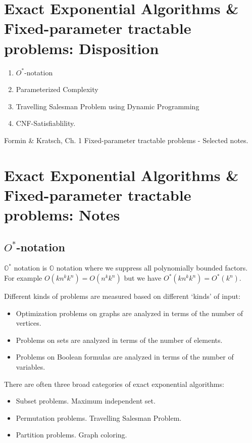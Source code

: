 \section{Exact Exponential Algorithms \& Fixed-parameter tractable problems: Disposition}
\begin{enumerate}
  \item $O^*$-notation
  \item Parameterized Complexity
  \item Travelling Salesman Problem using Dynamic Programming
  \item CNF-Satisfiablility.
\end{enumerate}

Formin \& Kratsch, Ch. 1
Fixed-parameter tractable problems - Selected notes.

\section{Exact Exponential Algorithms \& Fixed-parameter tractable problems: Notes}

\subsection{$O^*$-notation}
$\mathbb{O}^*$ notation is $\mathbb{O}$ notation where we suppress all
polynomially bounded factors. For example $O(kn^kk^n) = O(n^kk^n)$ but we have
$O^*(kn^kk^n) = O^*(k^n)$.

Different kinds of problems are measured based on different `kinds' of input:
\begin{itemize}
	\item Optimization problems on graphs are analyzed in terms of the number of vertices.
	\item Problems on sets are analyzed in terms of the number of elements.
	\item Problems on Boolean formulas are analyzed in terms of the number of variables.
\end{itemize}

There are often three broad categories of exact exponential algorithms:
\begin{itemize}
	\item Subset problems. Maximum independent set.
	\item Permutation problems. Travelling Salesman Problem.
	\item Partition problems. Graph coloring.
\end{itemize}

